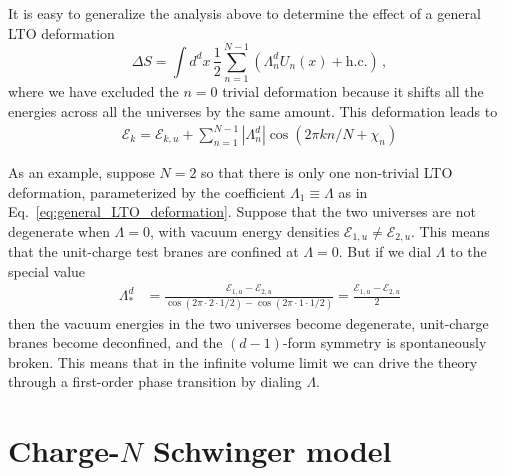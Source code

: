 \documentclass[11pt]{article}
\def\coeff#1#2{{\textstyle {\frac {#1}{#2}}}}
\def\half{\coeff 12}
\begin{document}
It is easy to generalize the analysis above to determine the effect of a general
LTO deformation
\begin{equation}
    \Delta S=\int d^{d}x \, \half \sum_{n=1}^{N-1}  \left(\Lambda_n^d U_n(x)+ \mathrm{h.c.} \right)\,,
    \label{eq:general_LTO_deformation}
\end{equation}
where we have excluded the $n=0$ trivial deformation because it shifts all the energies across all the universes by the same amount. This deformation leads to
\begin{align}
\boxed{\mathcal{E}_k = \mathcal{E}_{k,u} +\sum_{n=1}^{N-1}|\Lambda_n^d| \cos{(2\pi  k n/N +\chi_n) }}
\end{align}

As an example, suppose $N=2$ so that there is only one non-trivial LTO deformation,
parameterized by the coefficient $\Lambda_1\equiv\Lambda$ as in
Eq.~\eqref{eq:general_LTO_deformation}. Suppose that the  two universes are not
degenerate when $\Lambda = 0$, with vacuum energy densities $\mathcal{E}_{1,u}
\neq \mathcal{E}_{2,u}$. This means that the unit-charge test branes are confined at
$\Lambda = 0$.  But if we dial
$\Lambda$ to the special value
\begin{align}
     \Lambda_{*}^d&=\frac{\mathcal{E}_{1,u}-\mathcal{E}_{2,u}}{\cos{(2\pi \cdot 2 \cdot 1 /2)}-\cos{(2\pi \cdot 1 \cdot 1/2)}} =\frac{\mathcal{E}_{1,u}-\mathcal{E}_{2,u}}{2}
    \label{eq:tuned_lambda}
\end{align}
then the vacuum energies in the two universes become degenerate, unit-charge branes become deconfined, and the $(d-1)$-form symmetry is spontaneously broken.  This means that in the infinite volume limit we can drive the theory through a first-order phase transition by dialing $\Lambda$. 

\section{Charge-$N$ Schwinger model}
\label{sec:schwinger}
\end{document}
